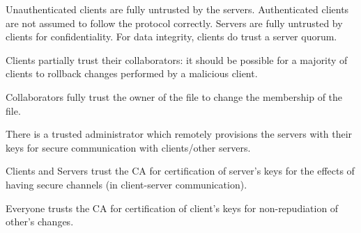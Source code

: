 Unauthenticated clients are fully untrusted by the servers.
Authenticated clients are not assumed to follow the protocol
correctly.
Servers are fully untrusted by clients for confidentiality.
For data integrity, clients do trust a server quorum.

Clients partially trust their collaborators: it should be possible for
a majority of clients to rollback changes performed by a malicious client.

Collaborators fully trust the owner of the file to change the
membership of the file.

There is a trusted administrator which
remotely provisions the servers with their keys for secure
communication with clients/other servers.

Clients and Servers trust the CA for certification of server's keys
for the effects of having secure channels (in client-server communication).

Everyone trusts the CA for certification of client's keys for
non-repudiation of other's changes.
